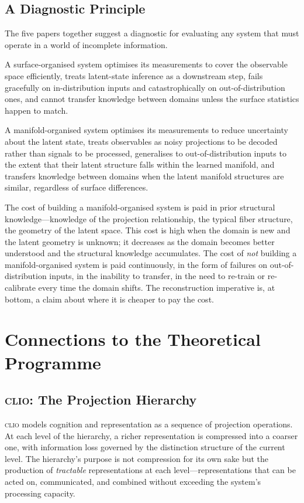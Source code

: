 \documentclass[12pt, letterpaper]{article}
\theoremstyle{remark}
\newcommand{\clio}{\textsc{clio}}
\begin{document}
\subsection{A Diagnostic Principle}

The five papers together suggest a diagnostic for evaluating any system
that must operate in a world of incomplete information.

A surface-organised system optimises its measurements to cover the observable
space efficiently, treats latent-state inference as a downstream step, fails
gracefully on in-distribution inputs and catastrophically on
out-of-distribution ones, and cannot transfer knowledge between domains
unless the surface statistics happen to match.

A manifold-organised system optimises its measurements to reduce uncertainty
about the latent state, treats observables as noisy projections to be decoded
rather than signals to be processed, generalises to out-of-distribution
inputs to the extent that their latent structure falls within the learned
manifold, and transfers knowledge between domains when the latent manifold
structures are similar, regardless of surface differences.

The cost of building a manifold-organised system is paid in prior structural
knowledge---knowledge of the projection relationship, the typical fiber
structure, the geometry of the latent space.  This cost is high when the
domain is new and the latent geometry is unknown; it decreases as the domain
becomes better understood and the structural knowledge accumulates.  The cost
of \emph{not} building a manifold-organised system is paid continuously, in
the form of failures on out-of-distribution inputs, in the inability to
transfer, in the need to re-train or re-calibrate every time the domain
shifts.  The reconstruction imperative is, at bottom, a claim about where
it is cheaper to pay the cost.

\section{Connections to the Theoretical Programme}

\subsection{\clio{}: The Projection Hierarchy}

\clio{} models cognition and representation as a sequence of projection
operations.  At each level of the hierarchy, a richer representation is
compressed into a coarser one, with information loss governed by the
distinction structure of the current level.  The hierarchy's purpose is
not compression for its own sake but the production of \emph{tractable}
representations at each level---representations that can be acted on,
communicated, and combined without exceeding the system's processing
capacity.
\end{document}
